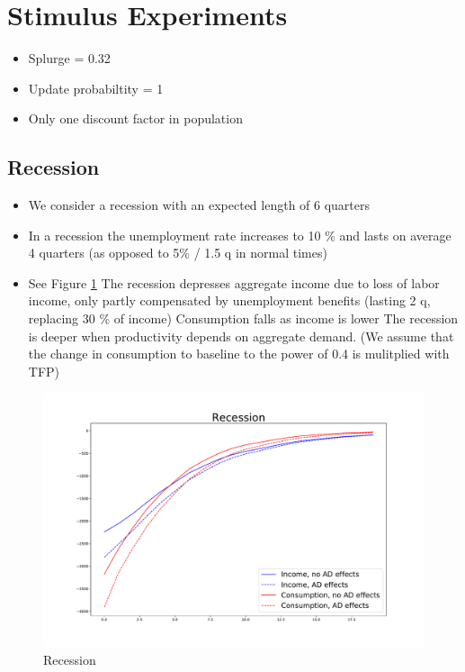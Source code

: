 \documentclass[]{article}
\begin{document}
\section{Stimulus Experiments}

\begin{itemize}
	\item Splurge = 0.32
	\item Update probabiltity = 1
	\item Only one discount factor in population
\end{itemize}	

\subsection{Recession}

\begin{itemize}
	\item We consider a recession with an expected length of 6 quarters
	\item In a recession the unemployment rate increases to 10 \% and lasts on average 4 quarters (as opposed to 5\% / 1.5 q in normal times)
	\item See Figure \ref{fig:recession}
	\subitem The recession depresses aggregate income due to loss of labor income, only partly compensated by unemployment benefits (lasting 2 q, replacing 30 \% of income)
	\subitem Consumption falls as income is lower
	\subitem The recession is deeper when productivity depends on aggregate demand. (We assume that the change in consumption to baseline to the power of 0.4 is mulitplied with TFP)
\end{itemize}


\begin{figure} 
	\begin{centering}
		\includegraphics[width=\linewidth]{../recession.pdf}
		\caption{Recession}
		\label{fig:recession}
	\end{centering}
\end{figure}
\end{document}
